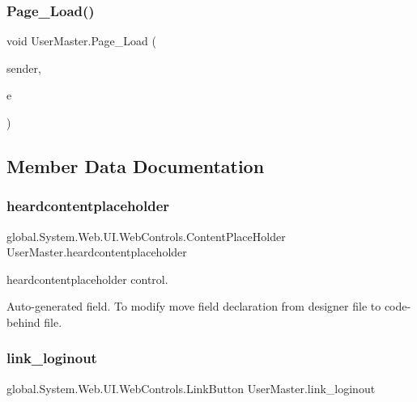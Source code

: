 \mbox{\label{class_user_master_aca92d74fee906c87a0a5a389f71a58b5}} 
\subsubsection{\texorpdfstring{Page\_Load()}{Page\_Load()}}
{\footnotesize\ttfamily void User\+Master.\+Page\+\_\+\+Load (\begin{DoxyParamCaption}\item[{object}]{sender,  }\item[{Event\+Args}]{e }\end{DoxyParamCaption})\hspace{0.3cm}{\ttfamily [protected]}}



\subsection{Member Data Documentation}
\mbox{\label{class_user_master_acadb227855710b24142e70095891121e}} 
\subsubsection{\texorpdfstring{heardcontentplaceholder}{heardcontentplaceholder}}
{\footnotesize\ttfamily global.\+System.\+Web.\+U\+I.\+Web\+Controls.\+Content\+Place\+Holder User\+Master.\+heardcontentplaceholder\hspace{0.3cm}{\ttfamily [protected]}}



heardcontentplaceholder control. 

Auto-\/generated field. To modify move field declaration from designer file to code-\/behind file. \mbox{\label{class_user_master_a53d6e767a177eb2d9340a61e112eeeb4}} 
\subsubsection{\texorpdfstring{link\_loginout}{link\_loginout}}
{\footnotesize\ttfamily global.\+System.\+Web.\+U\+I.\+Web\+Controls.\+Link\+Button User\+Master.\+link\+\_\+loginout\hspace{0.3cm}{\ttfamily [protected]}}



